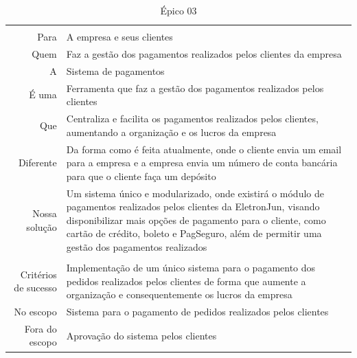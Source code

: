 \begin{table}[]
\centering
\label{label-epico03}
\begin{tabular}{
>{\columncolor[HTML]{96FFFB}}r l}
\multicolumn{2}{c}{\cellcolor[HTML]{34CDF9}Gerenciamento de pagamentos}   \\
Para                 & A empresa e seus clientes              \\
Quem                 & Faz a gestão dos pagamentos realizados pelos clientes da empresa              \\
A                    & Sistema de pagamentos                  \\
É uma                & Ferramenta que faz a gestão dos pagamentos realizados pelos clientes          \\
Que                  & Centraliza e facilita os pagamentos realizados pelos clientes, aumentando a organização e os lucros da empresa       \\
Diferente            & Da forma como é feita atualmente, onde o cliente envia um email para a empresa e a empresa envia um número de conta bancária para que o cliente faça um depósito         \\
Nossa solução        & Um sistema único e modularizado, onde existirá o módulo de pagamentos realizados pelos clientes da EletronJun, visando disponibilizar mais opções de pagamento para o cliente, como cartão de crédito, boleto e PagSeguro, além de permitir uma gestão dos pagamentos realizados \\
\multicolumn{2}{c}{\cellcolor[HTML]{34CDF9}Escopo}            \\
Critérios de sucesso & Implementação de um único sistema para o pagamento dos pedidos realizados pelos clientes de forma que aumente a organização e consequentemente os lucros da empresa       \\
No escopo            & Sistema para o pagamento de pedidos realizados pelos clientes                 \\
Fora do escopo       & Aprovação do sistema pelos clientes   
\end{tabular}
\caption{Épico 03}
\end{table}

